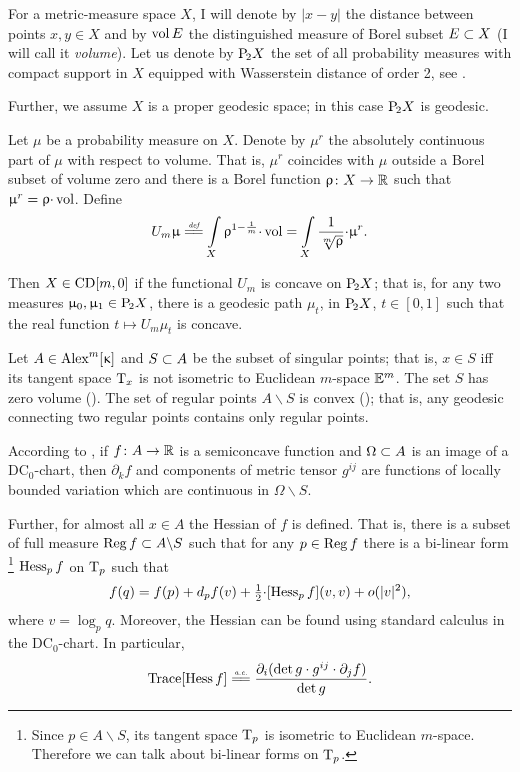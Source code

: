 \documentclass[oneside,a4paper]{article}
\begin{document}
For a metric-measure space $X$, 
I will denote 
by $|x-y|$ the distance between points $x,y\in X$
and by $\mathop{\rm vol}\nolimits E$ the distinguished measure of Borel subset $E\subset X$ (I will call it \emph{volume}).
Let us denote by $\mathrm {P}_{\!2} X$ the set of all probability measures with compact support in $X$ equipped with Wasserstein distance of order 2, see \cite[6.1]{villani}.

Further, we assume $X$ is a proper geodesic space;
in this case $\mathrm {P}_{\!2} X$ is geodesic.

Let $\mu$ be a probability measure on $X$.
Denote by $\mu^{r}$ the absolutely continuous part of $\mu$ with respect to volume.
That is, 
$\mu^{r}$ coincides with $\mu$ outside a Borel subset of volume zero and
 there is a Borel function $\upvarrho\colon X\to\mathbb{R}$ such that $\mu^{r}\z=\rho{\cdot}\vol$.
Define
$$U_m\mu
\df
\int\limits_X\rho^{1-\frac1m}{\cdot}\vol
=
\int\limits_X\frac1{\sqrt[m]{\rho}}{\cdot}\mu^r.$$

Then $X\in \CD m0$ if the functional $U_m$ is concave on  $\mathrm {P}_{\!2} X$;
that is, for any two measures $\upmu_0,\upmu_1\in \mathrm {P}_{\!2} X$,
there is a geodesic path $\mu_t$, in $\mathrm {P}_{\!2} X$, $t\in[0,1]$ such that the real function $t\mapsto U_m\mu_t$ is concave.



Let $A\in\CBB m\kappa$ and $S\subset A$ be the subset of singular points;
that is, $x\in S$ iff its tangent space $\text{\rm T}_x$ is not isometric to Euclidean $m$-space $\mathbb{E}^m$. 
The set $S$ has zero volume (\cite[10.6]{BGP}).
The set of regular points $A\backslash S$ is convex (\cite{petrunin:parallel}); 
that is, any geodesic connecting two regular points contains only regular points.

According to \cite{perelman:DC},  
if $f\colon A\to\mathbb{R}$ is a semiconcave function 
and $\Omega\subset A$ is an image of a $\mathrm{DC}_0$-chart,
then
$\partial_k f$ and components of metric tensor $g^{i j}$ are functions of locally bounded variation which are continuous in $\Omega\backslash S$.

Further, for almost all $x\in A$ the Hessian of $f$ is defined.
That is, there is a subset of full measure $\mathop{\rm Reg}\nolimits f\subset A\backslash S$ such that for any $p\in \mathop{\rm Reg}\nolimits f$ there is a bi-linear form%
\footnote{Since $p\in A\backslash S$, its tangent space $\text{\rm T}_p$ is isometric to Euclidean $m$-space. Therefore we can talk about bi-linear forms on $\text{\rm T}_p$.}
 $\operatorname{Hess}_p f$ on $\text{\rm T}_p$ such that 
$$f(q)=f(p)+d_p f(v)+\tfrac12{\cdot}[\operatorname{Hess}_p f](v,v)+o(|v|^2),$$
where $v=\log_p q$.
Moreover, the Hessian can be found using standard calculus in the $\mathrm{DC}_0$-chart.
In particular,
$$\Trace[\Hess f]
\ae
\frac{\partial_i(\det g\cdot g^{i j}\cdot\partial_j f)}{\det g}.$$
\end{document}
